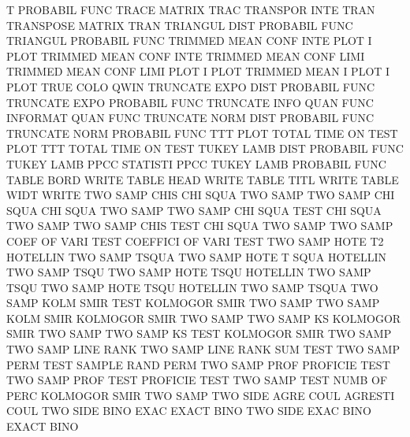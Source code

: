 T                                       PROBABIL FUNC
TRACE                                   MATRIX   TRAC
TRANSPOR INTE                           TRAN
TRANSPOSE                               MATRIX   TRAN
TRIANGUL DIST                           PROBABIL FUNC
TRIANGUL                                PROBABIL FUNC
TRIMMED  MEAN CONF INTE PLOT            I        PLOT
TRIMMED  MEAN CONF INTE                 TRIMMED  MEAN CONF LIMI
TRIMMED  MEAN CONF LIMI PLOT            I        PLOT
TRIMMED  MEAN I    PLOT                 I        PLOT
TRUE     COLO                           QWIN
TRUNCATE EXPO DIST                      PROBABIL FUNC
TRUNCATE EXPO                           PROBABIL FUNC
TRUNCATE INFO QUAN FUNC                 INFORMAT QUAN FUNC
TRUNCATE NORM DIST                      PROBABIL FUNC
TRUNCATE NORM                           PROBABIL FUNC
TTT      PLOT                           TOTAL    TIME ON   TEST PLOT
TTT                                     TOTAL    TIME ON   TEST
TUKEY    LAMB DIST                      PROBABIL FUNC
TUKEY    LAMB PPCC                      STATISTI PPCC
TUKEY    LAMB                           PROBABIL FUNC
TABLE    BORD                           WRITE
TABLE    HEAD                           WRITE
TABLE    TITL                           WRITE
TABLE    WIDT                           WRITE
TWO      SAMP CHIS                      CHI      SQUA TWO  SAMP
TWO      SAMP CHI  SQUA                 CHI      SQUA TWO  SAMP
TWO      SAMP CHI  SQUA TEST            CHI      SQUA TWO  SAMP
TWO      SAMP CHIS TEST                 CHI      SQUA TWO  SAMP
TWO      SAMP COEF OF   VARI TEST       COEFFICI OF   VARI TEST
TWO      SAMP HOTE T2                   HOTELLIN TWO  SAMP TSQUA
TWO      SAMP HOTE T    SQUA            HOTELLIN TWO  SAMP TSQU
TWO      SAMP HOTE TSQU                 HOTELLIN TWO  SAMP TSQU
TWO      SAMP HOTE TSQU                 HOTELLIN TWO  SAMP TSQUA
TWO      SAMP KOLM SMIR TEST            KOLMOGOR SMIR TWO  SAMP
TWO      SAMP KOLM SMIR                 KOLMOGOR SMIR TWO  SAMP
TWO      SAMP KS                        KOLMOGOR SMIR TWO  SAMP
TWO      SAMP KS   TEST                 KOLMOGOR SMIR TWO  SAMP
TWO      SAMP LINE RANK                 TWO      SAMP LINE RANK SUM TEST
TWO      SAMP PERM TEST                 SAMPLE   RAND PERM
TWO      SAMP PROF                      PROFICIE TEST
TWO      SAMP PROF TEST                 PROFICIE TEST
TWO      SAMP TEST NUMB OF   PERC       KOLMOGOR SMIR TWO  SAMP
TWO      SIDE AGRE COUL                 AGRESTI  COUL
TWO      SIDE BINO EXAC                 EXACT    BINO
TWO      SIDE EXAC BINO                 EXACT    BINO
